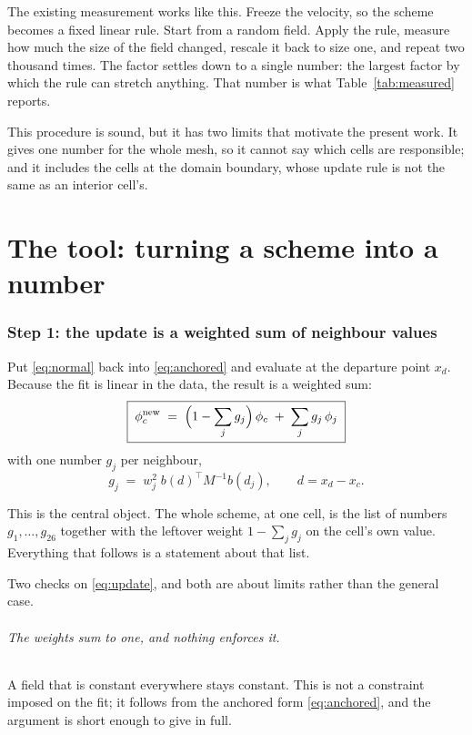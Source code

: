 \documentclass[11pt,a4paper]{article}
\begin{document}
The existing measurement works like this. Freeze the velocity, so the scheme becomes a fixed
linear rule. Start from a random field. Apply the rule, measure how much the size of the
field changed, rescale it back to size one, and repeat two thousand times. The factor
settles down to a single number: the largest factor by which the rule can stretch anything.
That number is what Table~\ref{tab:measured} reports.

This procedure is sound, but it has two limits that motivate the present work. It gives one
number for the whole mesh, so it cannot say which cells are responsible; and it includes the
cells at the domain boundary, whose update rule is not the same as an interior cell's.

\part{The tool: turning a scheme into a number}
\label{part:tool}

\section{Step 1: the update is a weighted sum of neighbour values}

Put \eqref{eq:normal} back into \eqref{eq:anchored} and evaluate at the departure point
$x_d$. Because the fit is linear in the data, the result is a weighted sum:
\begin{equation}
  \boxed{\;
  \phi_c^{\text{new}}
  \;=\; \Bigl(1 - \sum_j g_j\Bigr)\,\phi_c \;+\; \sum_j g_j\, \phi_j \;}
  \label{eq:update}
\end{equation}
with one number $g_j$ per neighbour,
\begin{equation}
  g_j \;=\; w_j^2 \; b(d)^{\!\top} M^{-1} b(d_j),
  \qquad d = x_d - x_c .
  \label{eq:gj}
\end{equation}

This is the central object. The whole scheme, at one cell, is the list of numbers
$g_1, \dots, g_{26}$ together with the leftover weight $1 - \sum_j g_j$ on the cell's own
value. Everything that follows is a statement about that list.

Two checks on \eqref{eq:update}, and both are about limits rather than the general case.

\paragraph{The weights sum to one, and nothing enforces it.} A field that is constant
everywhere stays constant. This is not a constraint imposed on the fit; it follows from the
anchored form \eqref{eq:anchored}, and the argument is short enough to give in full.
\end{document}
